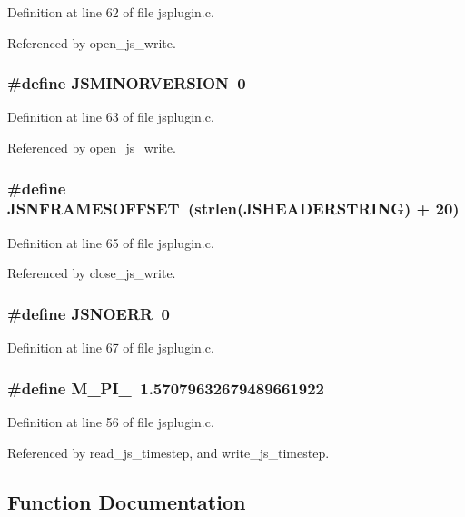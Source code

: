 Definition at line 62 of file jsplugin.c.

Referenced by open\_\-js\_\-write.
\subsubsection{\setlength{\rightskip}{0pt plus 5cm}\#define JSMINORVERSION\ 0}\label{jsplugin_8c_a5}




Definition at line 63 of file jsplugin.c.

Referenced by open\_\-js\_\-write.
\subsubsection{\setlength{\rightskip}{0pt plus 5cm}\#define JSNFRAMESOFFSET\ (strlen(JSHEADERSTRING) + 20)}\label{jsplugin_8c_a6}




Definition at line 65 of file jsplugin.c.

Referenced by close\_\-js\_\-write.
\subsubsection{\setlength{\rightskip}{0pt plus 5cm}\#define JSNOERR\ 0}\label{jsplugin_8c_a7}




Definition at line 67 of file jsplugin.c.
\subsubsection{\setlength{\rightskip}{0pt plus 5cm}\#define M\_\-PI\_\ 1.57079632679489661922}\label{jsplugin_8c_a0}




Definition at line 56 of file jsplugin.c.

Referenced by read\_\-js\_\-timestep, and write\_\-js\_\-timestep.

\subsection{Function Documentation}

